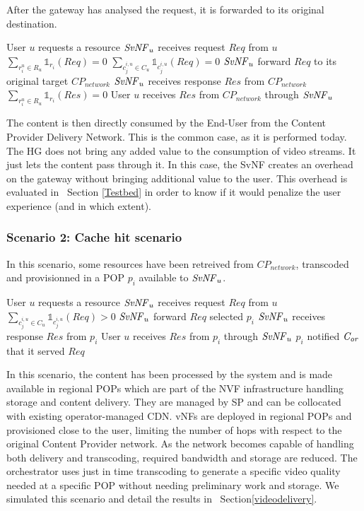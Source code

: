 After the gateway has analysed the request, it is forwarded to its original destination.

\begin{algorithmic}[1]
	
\STATE User $u$ requests a resource
\STATE $\mathit{SvNF}_{u}$ receives request $\mathit{Req}$ from $u$
\STATE \( \sum_{r^{u}_{i}\in R_{u}}{\mathbb{1}_{r_{i}}(\mathit{Req})}=0 \)
\STATE \( \sum_{c^{i,u}_{j}\in C_{u}}{\mathbb{1}_{c^{i,u}_{j}}(\mathit{Req})}=0 \)
\STATE $\mathit{SvNF}_{u}$ forward $\mathit{Req}$ to its original target \(\mathit{CP}_{\mathit{network}}\)
\STATE $\mathit{SvNF}_{u}$ receives response $\mathit{Res}$ from \(\mathit{CP}_{\mathit{network}}\)
\STATE \( \sum_{r^{u}_{i}\in R_{u}}{\mathbb{1}_{r_{i}}(\mathit{Res})}=0 \)
\STATE User $u$ receives $\mathit{Res}$ from \(\mathit{CP}_{\mathit{network}}\) through $\mathit{SvNF}_{u}$
\end{algorithmic}


The content is then directly consumed by the End-User from the Content Provider Delivery Network.
This is the common case, as it is performed today. The HG does not bring any added value to the consumption of video streams. It just lets the content pass through it.
In this case, the SvNF creates an overhead on the gateway without bringing additional value to the user.
This overhead is evaluated in ~Section \ref{Testbed} in order to know if it would penalize the user experience (and in which extent).

\subsubsection*{Scenario 2: Cache hit scenario}

In this scenario, some resources have been retreived from \(\mathit{CP}_{\mathit{network}}\), transcoded and provisionned in a POP $p_{i}$ available to $\mathit{SvNF}_{u}$.

\begin{algorithmic}[1]
	\STATE User $u$ requests a resource
\STATE $\mathit{SvNF}_{u}$ receives request $\mathit{Req}$ from $u$
\STATE \( \sum_{c^{i,u}_{j}\in C_{u}}{\mathbb{1}_{c^{i,u}_{j}}(\mathit{Req})}>0\)
\STATE $\mathit{SvNF}_{u}$ forward $\mathit{Req}$ selected $p_{i}$
\STATE $\mathit{SvNF}_{u}$ receives response $\mathit{Res}$ from $p_{i}$
\STATE User $u$ receives $\mathit{Res}$ from $p_{i}$ through $\mathit{SvNF}_{u}$
\STATE $p_{i}$ notified $\mathit{C_{or}}$ that it served  $\mathit{Req}$
\end{algorithmic}


In this scenario, the content has been processed by the system and is made available in regional POPs which are part of the NVF infrastructure handling storage and content delivery.
They are managed by SP and can be collocated with existing operator-managed CDN.
vNFs are deployed in regional POPs and provisioned close to the user, limiting the number of hops with respect to the original Content Provider network.
As the network becomes capable of handling both delivery and transcoding, required bandwidth and storage are reduced. The orchestrator uses just in time transcoding to generate a specific video quality needed at a specific POP without needing preliminary work and storage.
We simulated this scenario and detail the results in ~Section\ref{videodelivery}.

